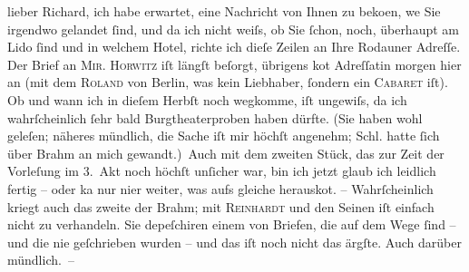 \begin{ledgroupsized}[t]{13cm}
           \pstart
           lieber Richard, ich habe erwartet, eine Nachricht von Ihnen zu
                  beko{\geminationm}en, we{\geminationn} Sie
               irgendwo gelandet ſind, und da ich nicht weiſs, ob Sie ſchon, noch, überhaupt am Lido ſind und in welchem Hotel, richte ich dieſe
               Zeilen an Ihre Rodauner Adreſſe. Der Brief an \textsc{Mir. Horwitz} iſt längſt beſorgt, übrigens ko{\geminationm}t Adreſſatin
               morgen hier an (mit dem \textsc{Roland} von Berlin, was kein Liebhaber, ſondern ein \textsc{Caba{\pb}ret} iſt). Ob und wann ich in dieſem
               Herbſt noch wegkomme, iſt ungewiſs, da ich wahrſcheinlich ſehr bald Burgtheaterproben haben dürfte. (Sie haben wohl geleſen; näheres
               mündlich, die Sache iſt mir höchſt angenehm; Schl. hatte ſich über Brahm an mich
               gewandt.) Auch mit dem zweiten Stück, das zur Zeit der Vorleſung im 3. Akt noch höchſt unſicher war, bin
               ich jetzt glaub ich leidlich fertig – oder ka{\geminationn} nur ni{\geminationm}er weiter, was aufs gleiche {\pb}herausko{\geminationm}t. –
               Wahrſcheinlich kriegt auch das zweite der Brahm;
               mit \textsc{Reinhardt} und den Seinen iſt einfach nicht zu
               verhandeln. Sie depeſchiren einem von Briefen, die auf dem Wege ſind – und die nie
               geſchrieben wurden – und das iſt noch nicht das ärgſte. Auch darüber mündlich. –\pend

\end{ledgroupsized}
